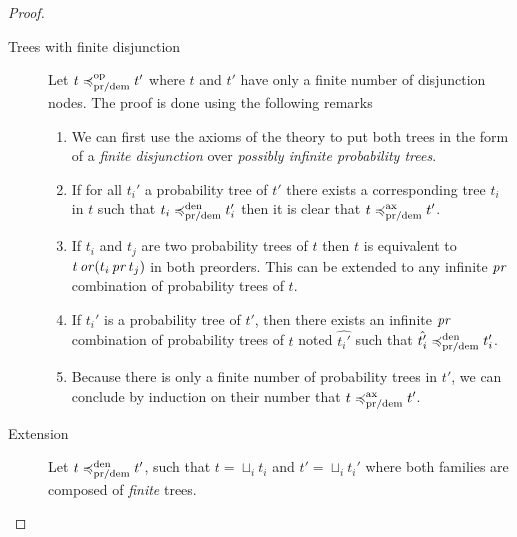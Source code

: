 \begin{proof}
\begin{itemize}
\begin{description}
      

        \item[Trees with finite disjunction]

    Let $t \preccurlyeq^{\text{op}}_{\text{pr/dem}} t'$ 
    where $t$ and $t'$ have only a finite number 
    of disjunction nodes.
    The proof is done using the following 
    remarks
    \begin{enumerate}
        \item We can first use the axioms of the theory 
            to put both trees in the form of 
            a \emph{finite disjunction} over 
            \emph{possibly infinite probability trees}.

        \item 
            If for all $t_i'$ 
            a probability
            tree of $t'$ there exists 
            a corresponding tree $t_i$ in $t$ 
            such that $t_i \preccurlyeq^{\text{den}}_{\text{pr/dem}} t_i'$
            then it is clear that $t \preccurlyeq^{\text{ax}}_{\text{pr/dem}} t'$.

        \item 
            If $t_i$ and $t_j$ are two 
            probability trees of $t$ 
            then $t$ is equivalent to 
            $t \operatorname{\mathit{or}} (t_i \operatorname{\mathit{pr}} t_j)$ 
            in both preorders.
            This can be extended to any infinite 
            $\operatorname{\mathit{pr}}$ combination 
            of probability trees of $t$.

        \item 
            If $t_i'$ is a probability tree of $t'$,
            then there exists an infinite $\operatorname{\mathit{pr}}$
            combination of probability trees of $t$
            noted $\hat{t_i'}$
            such that $\hat{t_i'} \preccurlyeq^{\text{den}}_{\text{pr/dem}} t_i'$.


        \item Because there is only a finite number 
            of probability trees in $t'$, we can 
            conclude by induction on their number that 
            $t \preccurlyeq^{\text{ax}}_{\text{pr/dem}} t'$.
    \end{enumerate}


        \item[Extension]
    Let $t \preccurlyeq^{\text{den}}_{\text{pr/dem}} t'$,
    such that $t = \sqcup_i t_i$ and $t' = \sqcup_i t_i'$ 
    where both families are composed of \emph{finite} trees.


\end{description}
\end{itemize}
\end{proof}
